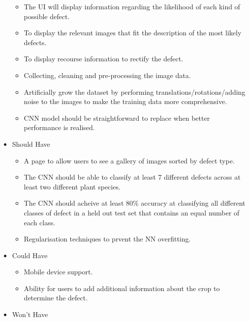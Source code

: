 \begin{itemize}
\begin{itemize}
  	\item The UI will display information regarding the likelihood of each kind of possible defect.
  	\item To display the relevant images that fit the description of the most likely defects.
  	\item To display recourse information to rectify the defect.
  	\item Collecting, cleaning and pre-processing the image data.
    \item Artificially grow the dataset by performing translations/rotations/adding noise to the images to make the training data more comprehensive.
    \item CNN model should be straightforward to replace when better performance is realised.
  \end{itemize}
  \item Should Have
  \begin{itemize}
    \item A page to allow users to see a gallery of images sorted by
      defect type.
    \item The CNN should be able to classify at least 7 different defects across at least two different plant species.
    \item The CNN should acheive at least 80\% accuracy at classifying all different classes of defect in a held out test set that contains an equal number of each class.
  	\item Regularisation techniques to prvent the NN overfitting.
  \end{itemize}
  \item Could Have
    \begin{itemize}
      \item Mobile device support.
    \end{itemize}
  \begin{itemize}
    \item Ability for users to add additional information about the crop
      to determine the defect.
  \end{itemize}
  \item Won't Have
\end{itemize}


